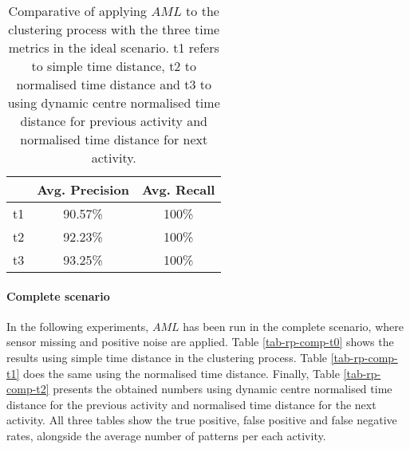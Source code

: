 \begin{table}[htbp]\scriptsize
\begin{center}
 \begin{tabular}{ccc}
  \hline
   & Avg. Precision & Avg. Recall \\
  \hline
  t1 & 90.57\% & 100\% \\
  t2 & 92.23\% & 100\% \\
  t3 & 93.25\% & 100\% \\
  \hline
 \end{tabular}
 \caption{Comparative of applying $AML$ to the clustering process with the three time metrics in the ideal scenario. t1 refers to simple time distance, t2 to normalised time distance and t3 to using dynamic centre normalised time distance for previous activity and normalised time distance for next activity.}
 \label{tab-aml-comparative-ideal}
\end{center} 
\end{table}

\paragraph*{Complete scenario}

In the following experiments, $AML$ has been run in the complete scenario, where sensor missing and positive noise are applied. Table \ref{tab-rp-comp-t0} shows the results using simple time distance in the clustering process. Table \ref{tab-rp-comp-t1} does the same using the normalised time distance. Finally, Table \ref{tab-rp-comp-t2} presents the obtained numbers using dynamic centre normalised time distance for the previous activity and normalised time distance for the next activity. All three tables show the true positive, false positive and false negative rates, alongside the average number of patterns per each activity.

